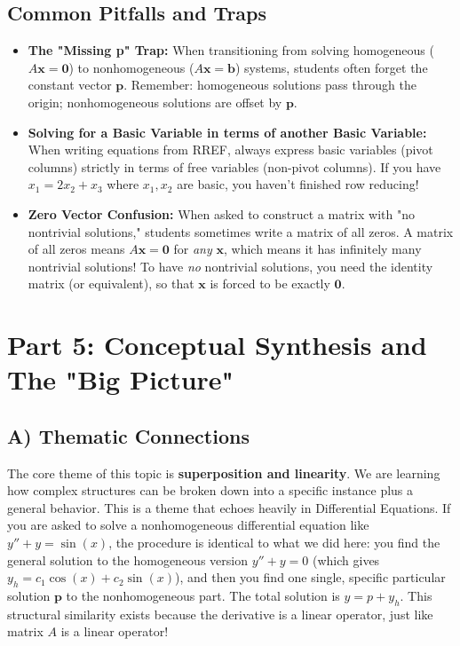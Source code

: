 \documentclass[11pt]{article}
\begin{document}
\subsection*{Common Pitfalls and Traps}
\begin{itemize}
    \item \textbf{The "Missing p" Trap:} When transitioning from solving homogeneous ($A\mathbf{x} = \mathbf{0}$) to nonhomogeneous ($A\mathbf{x} = \mathbf{b}$) systems, students often forget the constant vector $\mathbf{p}$. Remember: homogeneous solutions pass through the origin; nonhomogeneous solutions are offset by $\mathbf{p}$.
    \item \textbf{Solving for a Basic Variable in terms of another Basic Variable:} When writing equations from RREF, always express basic variables (pivot columns) strictly in terms of free variables (non-pivot columns). If you have $x_1 = 2x_2 + x_3$ where $x_1, x_2$ are basic, you haven't finished row reducing!
    \item \textbf{Zero Vector Confusion:} When asked to construct a matrix with "no nontrivial solutions," students sometimes write a matrix of all zeros. A matrix of all zeros means $A\mathbf{x} = \mathbf{0}$ for \textit{any} $\mathbf{x}$, which means it has infinitely many nontrivial solutions! To have \textit{no} nontrivial solutions, you need the identity matrix (or equivalent), so that $\mathbf{x}$ is forced to be exactly $\mathbf{0}$.
\end{itemize}

\newpage
\section{Part 5: Conceptual Synthesis and The "Big Picture"}

\subsection{A) Thematic Connections}
The core theme of this topic is \textbf{superposition and linearity}. We are learning how complex structures can be broken down into a specific instance plus a general behavior. 
This is a theme that echoes heavily in Differential Equations. If you are asked to solve a nonhomogeneous differential equation like $y'' + y = \sin(x)$, the procedure is identical to what we did here: you find the general solution to the homogeneous version $y'' + y = 0$ (which gives $y_h = c_1 \cos(x) + c_2 \sin(x)$), and then you find one single, specific particular solution $\mathbf{p}$ to the nonhomogeneous part. The total solution is $y = p + y_h$. This structural similarity exists because the derivative is a linear operator, just like matrix $A$ is a linear operator!
\end{document}
